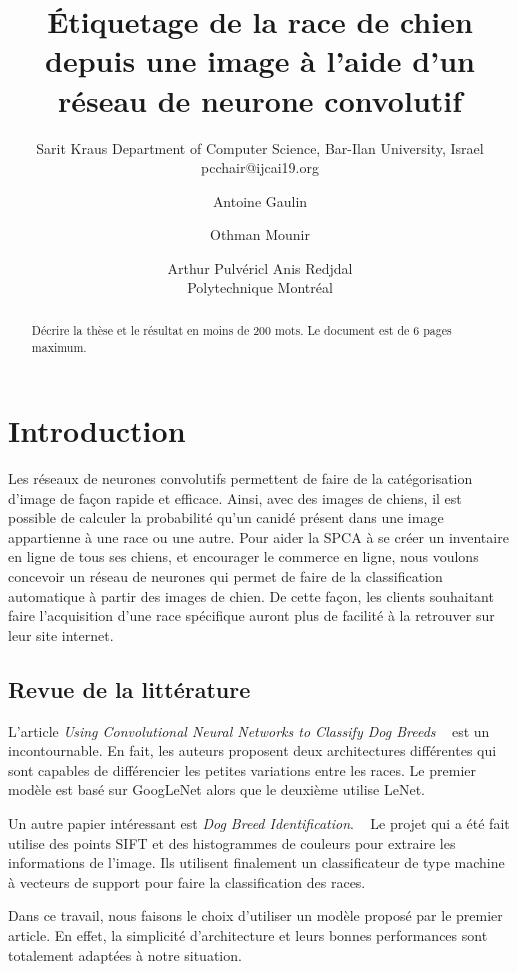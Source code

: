 \documentclass{article}
\title{Étiquetage de la race de chien depuis une image à l'aide d'un réseau de neurone convolutif}
\author{
    Sarit Kraus
    \affiliations
    Department of Computer Science, Bar-Ilan University, Israel \emails
    pcchair@ijcai19.org
}
\author{
Antoine Gaulin\and
Othman Mounir\and
Arthur Pulvéricl\And
Anis Redjdal\\
\affiliations
Polytechnique Montréal\\
}
\begin{document}
\maketitle

\begin{abstract}
Décrire la thèse et le résultat en moins de 200 mots. Le document est de 6 pages maximum.
\end{abstract}

\section{Introduction}

Les réseaux de neurones convolutifs permettent de faire de la catégorisation 
d'image de façon rapide et efficace. Ainsi, avec des images de chiens, il est possible
de calculer la probabilité qu'un canidé présent dans une image appartienne à une 
race ou une autre. Pour aider la SPCA à se créer un inventaire en ligne de tous ses
chiens, et encourager le commerce en ligne, nous voulons concevoir un réseau de
 neurones qui permet de faire de la classification automatique à partir des images
de chien. De cette façon, les clients souhaitant faire l'acquisition d'une race 
spécifique auront plus de facilité à la retrouver sur leur site internet. 

\subsection{Revue de la littérature}
L'article \textit{Using Convolutional Neural Networks to Classify Dog Breeds}
~\cite{fcdh_FinalReport} est un incontournable. En fait, les auteurs proposent 
deux architectures différentes qui sont capables de différencier les petites
variations entre les races. Le premier modèle est basé sur GoogLeNet alors que le
deuxième utilise LeNet.

Un autre papier intéressant est \textit{Dog Breed Identification}. ~\cite{output} Le
projet qui a été fait utilise des points SIFT et des histogrammes de couleurs pour
extraire les informations de l'image. Ils utilisent finalement un classificateur de type
machine à vecteurs de support pour faire la classification des races.

Dans ce travail, nous faisons le choix d'utiliser un modèle proposé par le premier
article. En effet, la simplicité d’architecture et leurs bonnes performances sont
totalement adaptées à notre situation. 
\end{document}
